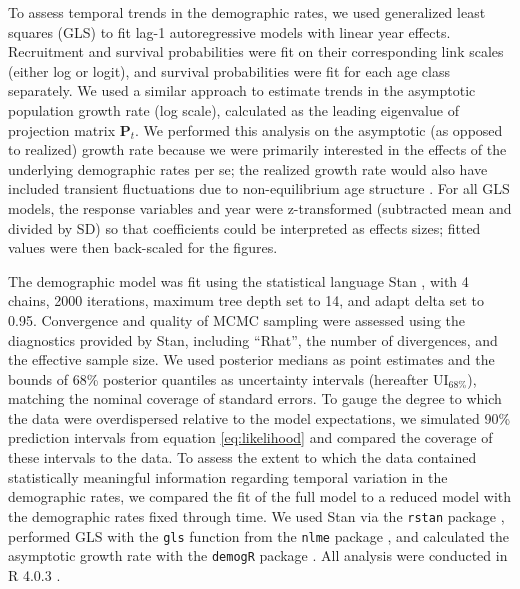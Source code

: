 \documentclass[11pt]{article}
\begin{document}
To assess temporal trends in the demographic rates, 
we used generalized least squares  (GLS) to fit lag-1 autoregressive models
with linear year effects.
Recruitment and survival probabilities were fit on their corresponding link scales 
(either log or logit),
and survival probabilities were fit for each age class separately.
We used a similar approach to estimate trends in the asymptotic population growth rate
(log scale), 
calculated as the leading eigenvalue of projection matrix $\mathbf{P}_{t}$.
We performed this analysis on the asymptotic (as opposed to realized) growth rate 
because we were primarily interested in the effects 
of the underlying demographic rates per se; 
the realized growth rate would also have included transient fluctuations due to
non-equilibrium age structure \citep{caswell2001matrix}.
For all GLS models, the response variables and year were z-transformed
(subtracted mean and divided by SD) so that coefficients
could be interpreted as effects sizes;
fitted values were then back-scaled for the figures.

The demographic model was fit using the statistical language Stan \citep{carpenter2017stan},
with 4 chains, 2000 iterations, maximum tree depth set to 14, and adapt delta set to 0.95.
Convergence and quality of MCMC sampling were assessed using the diagnostics provided by Stan, 
including ``Rhat'', the number of divergences, and the effective sample size.
We used posterior medians as point estimates 
and the bounds of 68\% posterior quantiles as uncertainty intervals 
(hereafter $\text{UI}_{68\%}$), 
matching the nominal coverage of standard errors.
To gauge the degree to which the data were overdispersed relative 
to the model expectations, 
we simulated 90\% prediction intervals from equation \ref{eq:likelihood} 
and compared the coverage of these intervals to the data.
To assess the extent to which the data contained statistically meaningful information 
regarding temporal variation in the demographic rates,
we compared the fit of the full model to a reduced model with the demographic
rates fixed through time.
We used Stan via the \texttt{rstan} package \citep{stan2020rstan},
performed GLS with the \texttt{gls} function 
from the \texttt{nlme} package \citep{pinheiro2020nlme}, 
and calculated the asymptotic growth rate with 
the \texttt{demogR} package \citep{holland2007demogR}.
All analysis were conducted in R 4.0.3 \citep{r2020}. 





\end{document}

